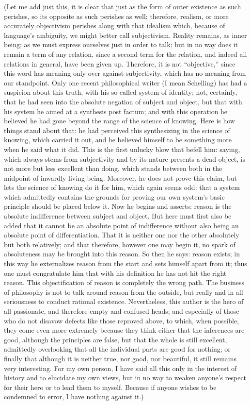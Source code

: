 (Let me add just this,
it is clear that just as
the form of outer existence as such perishes,
so its opposite as such perishes as well;
therefore, realism, or more accurately objectivism
perishes along with that idealism which,
because of language's ambiguity,
we might better call subjectivism.
Reality remains, as inner being;
as we must express ourselves just in order to talk;
but in no way does it remain a term of any relation,
since a second term for the relation,
and indeed all relations in general,
have been given up.
Therefore, it is not “objective,”
since this word has meaning only
over against subjectivity,
which has no meaning from our standpoint.
Only one recent philosophical writer
(I mean Schelling)
has had a suspicion about this truth,
with his so-called system of identity;
not, certainly, that he had seen into
the absolute negation of subject and object,
but that with his system he aimed
at a synthesis post factum;
and with this operation he believed
he had gone beyond the range
of the science of knowing.
Here is how things stand about that:
he had perceived this synthesizing
in the science of knowing,
which carried it out,
and he believed himself to be something more
when he said what it did.
This is the first unlucky blow that befell him:
saying, which always stems from subjectivity
and by its nature presents a dead object, is
not more but less excellent than doing,
which stands between both in
the midpoint of inwardly living being.
Moreover, he does not prove this claim,
but lets the science of knowing do it for him,
which again seems odd:
that a system which admittedly contains
the grounds for proving our own system's
basic principle should be placed below it.
Now he begins and asserts:
reason is the absolute indifference
between subject and object.
But here must first also be added
that it cannot be an absolute point of indifference
without also being an absolute point of differentiation.
That it is neither one nor the other absolutely
but both relatively;
and that therefore, however one may begin it,
no spark of absoluteness may be brought into this reason.
So then he says: reason exists;
in this way he externalizes reason from the start
and sets himself apart from it;
thus one must congratulate him
that with his definition he has not hit the right reason.
This objectification of reason is
completely the wrong path.
The business of philosophy is not
to talk around reason from the outside,
but really and in all seriousness
to conduct rational existence.
Nevertheless, this author is
the hero of all passionate,
and therefore empty and confused heads;
and especially of those who do not disavow
defects like those reproved above,
to which, when possible,
they come even more extremely
because they think either that the inferences are good,
although the principles are false,
but that the whole is still excellent,
admittedly overlooking that all
the individual parts are good for nothing;
or finally that although it is
neither true, nor good, nor beautiful,
it still remains very interesting.
For my own person, I have said all this
only in the interest of history
and to elucidate my own views,
but in no way to weaken anyone's respect
for their hero or to lead them to myself.
Because if anyone wishes to be condemned to error,
I have nothing against it.)


